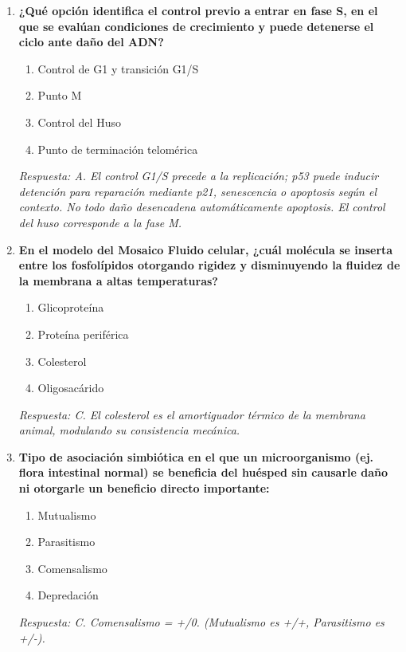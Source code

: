 \begin{enumerate}[label=\textbf{\arabic*.}]
    \item \textbf{¿Qué opción identifica el control previo a entrar en fase S, en el que se evalúan condiciones de crecimiento y puede detenerse el ciclo ante daño del ADN?}
    \begin{enumerate}
        \item[A)] Control de G1 y transición G1/S
        \item[B)] Punto M
        \item[C)] Control del Huso
        \item[D)] Punto de terminación telomérica
    \end{enumerate}
    \textit{Respuesta: A. El control G1/S precede a la replicación; p53 puede inducir detención para reparación mediante p21, senescencia o apoptosis según el contexto. No todo daño desencadena automáticamente apoptosis. El control del huso corresponde a la fase M.}

    \item \textbf{En el modelo del Mosaico Fluido celular, ¿cuál molécula se inserta entre los fosfolípidos otorgando rigidez y disminuyendo la fluidez de la membrana a altas temperaturas?}
    \begin{enumerate}
        \item[A)] Glicoproteína
        \item[B)] Proteína periférica
        \item[C)] Colesterol
        \item[D)] Oligosacárido
    \end{enumerate}
    \textit{Respuesta: C. El colesterol es el amortiguador térmico de la membrana animal, modulando su consistencia mecánica.}

    \item \textbf{Tipo de asociación simbiótica en el que un microorganismo (ej. flora intestinal normal) se beneficia del huésped sin causarle daño ni otorgarle un beneficio directo importante:}
    \begin{enumerate}
        \item[A)] Mutualismo
        \item[B)] Parasitismo
        \item[C)] Comensalismo
        \item[D)] Depredación
    \end{enumerate}
    \textit{Respuesta: C. Comensalismo = +/0. (Mutualismo es +/+, Parasitismo es +/-).}


\end{enumerate}
